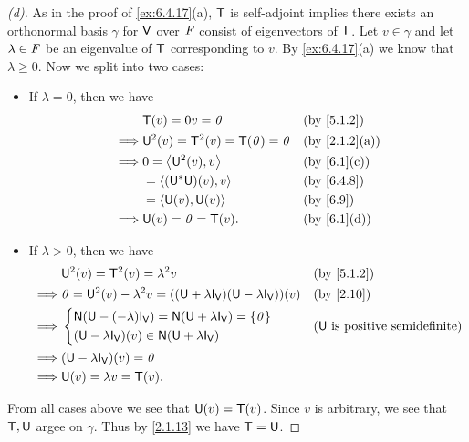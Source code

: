\begin{proof}[(d)]
  As in the proof of \cref{ex:6.4.17}(a), \(\mathsf{T}\) is self-adjoint implies there exists an orthonormal basis \(\gamma\) for \(\mathsf{V}\) over \(\mathit{F}\) consist of eigenvectors of \(\mathsf{T}\).
  Let \(v \in \gamma\) and let \(\lambda \in \mathit{F}\) be an eigenvalue of \(\mathsf{T}\) corresponding to \(v\).
  By \cref{ex:6.4.17}(a) we know that \(\lambda \geq 0\).
  Now we split into two cases:
  \begin{itemize}
    \item If \(\lambda = 0\), then we have
          \begin{align*}
                     & \T(v) = 0v = \zv                  &  & \by{5.1.2}    \\
            \implies & \U^2(v) = \T^2(v) = \T(\zv) = \zv &  & \by{2.1.2}[a] \\
            \implies & 0 = \inn{\U^2(v), v}              &  & \by{6.1}[c]   \\
                     & = \inn{(\U^* \U)(v), v}           &  & \by{6.4.8}    \\
                     & = \inn{\U(v), \U(v)}              &  & \by{6.9}      \\
            \implies & \U(v) = \zv = \T(v).              &  & \by{6.1}[d]
          \end{align*}
    \item If \(\lambda > 0\), then we have
          \begin{align*}
                     & \U^2(v) = \T^2(v) = \lambda^2 v                                                                         &  & \by{5.1.2} \\
            \implies & \zv = \U^2(v) - \lambda^2 v = ((\U + \lambda \IT[\V]) (\U - \lambda \IT[\V]))(v)                        &  & \by{2.10}  \\
            \implies & \begin{dcases}
                         \ns{\U - (-\lambda) \IT[\V]} = \ns{\U + \lambda \IT[\V]} = \set{\zv} \\
                         (\U - \lambda \IT[\V])(v) \in \ns{\U + \lambda \IT[\V]}
                       \end{dcases} &  & \text{(\(\U\) is positive semidefinite)}                    \\
            \implies & (\U - \lambda \IT[\V])(v) = \zv                                                                                         \\
            \implies & \U(v) = \lambda v = \T(v).
          \end{align*}
  \end{itemize}
  From all cases above we see that \(\mathsf{U}(v) = \mathsf{T}(v)\).
  Since \(v\) is arbitrary, we see that \(\mathsf{T}, \mathsf{U}\) argee on \(\gamma\).
  Thus by \cref{2.1.13} we have \(\mathsf{T} = \mathsf{U}\).
\end{proof}

